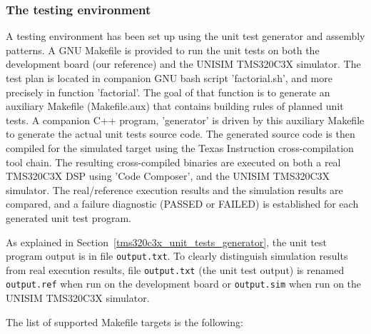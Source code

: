 \newpage
\subsubsection{The testing environment}
\label{tms320c3x_testing_environment}

A testing environment has been set up using the unit test generator and assembly patterns.
A GNU Makefile is provided to run the unit tests on both the development board (our reference) and the UNISIM TMS320C3X simulator.
The test plan is located in companion GNU bash script 'factorial.sh', and more precisely in function 'factorial'.
The goal of that function is to generate an auxiliary Makefile (Makefile.aux) that contains building rules of planned unit tests. A companion C++ program, 
'generator' is driven by this auxiliary Makefile to generate the actual unit tests source code.
The generated source code is then compiled for the simulated target using the Texas Instruction cross-compilation tool chain.
The resulting cross-compiled binaries are executed on both a real TMS320C3X DSP using 'Code Composer', and the UNISIM TMS320C3X simulator. The real/reference execution
results and the simulation results are compared, and a failure diagnostic (PASSED or FAILED) is established for each generated unit test program.

As explained in Section~\ref{tms320c3x_unit_tests_generator}, the unit test program output is in file \texttt{output.txt}.
To clearly distinguish simulation results from real execution results, file \texttt{output.txt} (the unit test output) is renamed \texttt{output.ref} when run on the development board or \texttt{output.sim} when run on the UNISIM TMS320C3X simulator.

\noindent The list of supported Makefile targets is the following:

